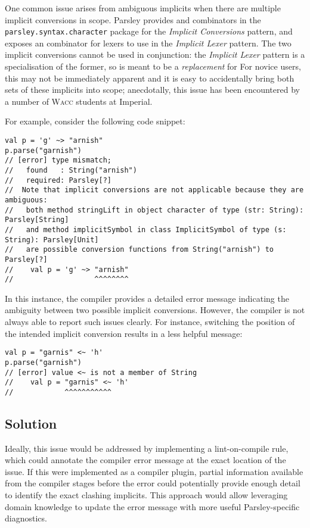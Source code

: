 \documentclass[../../main.tex]{subfiles}
\begin{document}
One common issue arises from ambiguous implicits when there are multiple implicit conversions in scope.
Parsley provides  and  combinators in the \texttt{parsley.syntax.character} package for the \emph{Implicit Conversions} pattern,
and exposes an  combinator for lexers to use in the \emph{Implicit Lexer} pattern.
The two implicit conversions cannot be used in conjunction: the \emph{Implicit Lexer} pattern is a specialisation of the former, so  is meant to be a \emph{replacement} for 
For novice users, this may not be immediately apparent and it is easy to accidentally bring both sets of these implicits into scope; anecdotally, this issue has been encountered by a number of \textsc{Wacc} students at Imperial.

For example, consider the following code snippet:
\begin{verbatim}
val p = 'g' ~> "arnish"
p.parse("garnish")
// [error] type mismatch;
//   found   : String("arnish")
//   required: Parsley[?]
//  Note that implicit conversions are not applicable because they are ambiguous:
//   both method stringLift in object character of type (str: String): Parsley[String]
//   and method implicitSymbol in class ImplicitSymbol of type (s: String): Parsley[Unit]
//   are possible conversion functions from String("arnish") to Parsley[?]
//    val p = 'g' ~> "arnish"
//                   ^^^^^^^^
\end{verbatim}
%
In this instance, the compiler provides a detailed error message indicating the ambiguity between two possible implicit conversions.
However, the compiler is not always able to report such issues clearly. For instance, switching the position of the intended implicit conversion results in a less helpful message:
\begin{verbatim}
val p = "garnis" <~ 'h'
p.parse("garnish")
// [error] value <~ is not a member of String
//    val p = "garnis" <~ 'h'
//            ^^^^^^^^^^^
\end{verbatim}

\subsection{Solution}
Ideally, this issue would be addressed by implementing a lint-on-compile rule, which could annotate the compiler error message at the exact location of the issue.
If this were implemented as a compiler plugin, partial information available from the compiler stages before the error could potentially provide enough detail to identify the exact clashing implicits.
This approach would allow leveraging domain knowledge to update the error message with more useful Parsley-specific diagnostics.
\end{document}
